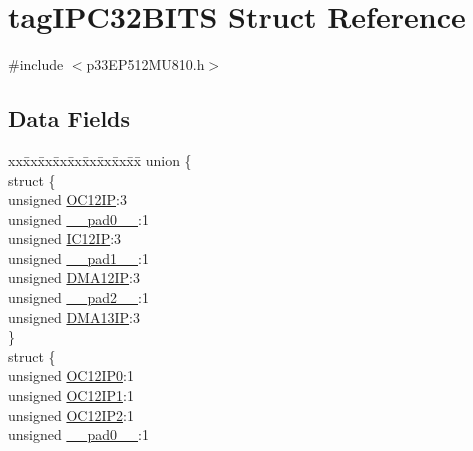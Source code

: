 \hypertarget{structtag_i_p_c32_b_i_t_s}{}\section{tag\+I\+P\+C32\+B\+I\+TS Struct Reference}
\label{structtag_i_p_c32_b_i_t_s}


{\ttfamily \#include $<$p33\+E\+P512\+M\+U810.\+h$>$}

\subsection*{Data Fields}
\begin{DoxyCompactItemize}
\item 
\begin{tabbing}
xx\=xx\=xx\=xx\=xx\=xx\=xx\=xx\=xx\=\kill
union \{\\
\>struct \{\\
\>\>unsigned \hyperlink{structtag_i_p_c32_b_i_t_s_abe49fb8b8101ce7723d28f25f3a6752f}{OC12IP}:3\\
\>\>unsigned \hyperlink{structtag_i_p_c32_b_i_t_s_adf71f3d8410c1f1dbbc96680a92c49af}{\_\_pad0\_\_}:1\\
\>\>unsigned \hyperlink{structtag_i_p_c32_b_i_t_s_afe3b36310b2cf33649f8a474320564d9}{IC12IP}:3\\
\>\>unsigned \hyperlink{structtag_i_p_c32_b_i_t_s_acaf2d0924a107ec6e8d2e31febaf66f9}{\_\_pad1\_\_}:1\\
\>\>unsigned \hyperlink{structtag_i_p_c32_b_i_t_s_ab43d1c44abd9c521d3048045a606a7ef}{DMA12IP}:3\\
\>\>unsigned \hyperlink{structtag_i_p_c32_b_i_t_s_a4d97cc5f7d51d22fc2bf3eab35c9cb7f}{\_\_pad2\_\_}:1\\
\>\>unsigned \hyperlink{structtag_i_p_c32_b_i_t_s_a6da17f923b2e95aa104dbabc85c2bf24}{DMA13IP}:3\\
\>\} \\
\>struct \{\\
\>\>unsigned \hyperlink{structtag_i_p_c32_b_i_t_s_ae7316e84c18ad535f7f253954139cd89}{OC12IP0}:1\\
\>\>unsigned \hyperlink{structtag_i_p_c32_b_i_t_s_a83bf1c2a320143a351bfb4630cbf9dcd}{OC12IP1}:1\\
\>\>unsigned \hyperlink{structtag_i_p_c32_b_i_t_s_a7f77562cf72445f2b56fbbbc5a5cf5a5}{OC12IP2}:1\\
\>\>unsigned \hyperlink{structtag_i_p_c32_b_i_t_s_adf71f3d8410c1f1dbbc96680a92c49af}{\_\_pad0\_\_}:1\\

\end{tabbing}
\end{DoxyCompactItemize}
